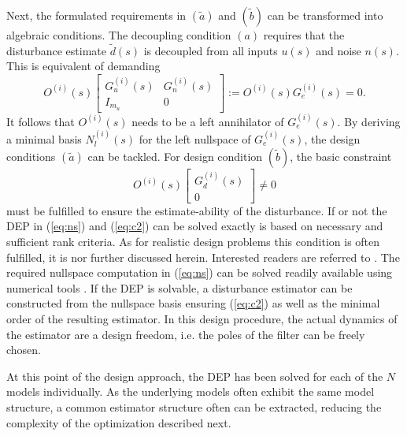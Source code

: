 \documentclass[graybox]{svmult}
\begin{document}
Next, the formulated requirements in $(\tilde a)$ and $(\tilde b)$ can be transformed into  algebraic conditions. 
The decoupling condition $(a)$ requires that the disturbance estimate $\tilde d(s)$ is decoupled from all inputs $u(s)$ and noise $n(s)$. This is equivalent of demanding 
\begin{equation}\label{eq:ns}
O^{(i)}(s) 
\begin{bmatrix}
G_u^{(i)}(s) & G^{(i)}_{n}(s)  \\ I_{m_u}& 0
\end{bmatrix}
:= O^{(i)}(s) G_e^{(i)}(s) =  0.
\end{equation}
It follows that $O^{(i)}(s)$ needs to be a left annihilator of $G_e^{(i)}(s)$. 
By deriving a minimal basis $N_l^{(i)}(s)$ for the left nullspace of $G_e^{(i)}(s)$,  the design conditions $(\tilde a)$ can be tackled. For design condition $(\tilde b)$, the basic constraint
\begin{equation}\label{eq:c2}
O^{(i)}(s) 
\begin{bmatrix}
G_{d}^{(i)}(s)  \\  0
\end{bmatrix}
\neq  0
\end{equation}
must be fulfilled to ensure the estimate-ability of the disturbance. If or not the DEP in (\ref{eq:ns}) and (\ref{eq:c2}) can be solved exactly is based on  necessary and sufficient rank criteria. As for realistic design problems this condition is often fulfilled, it is nor further discussed herein. Interested readers are referred to \cite{Var09, Ossmann18ccta, Varga17}.
The required nullspace computation in (\ref{eq:ns})  can  be solved readily available using numerical tools \cite{Varga17}. If the DEP is solvable, a disturbance estimator can be constructed from the nullspace basis ensuring (\ref{eq:c2}) as well as the minimal order of the resulting estimator. In this design procedure, the actual dynamics of the estimator are a design freedom, i.e. the poles of the filter can be freely chosen.

At this point of the design approach, the DEP has been solved for each of the $N$ models individually. As the underlying models often exhibit the same model structure, a common estimator structure often can be extracted, reducing the complexity of the  optimization described next. 
\end{document}

